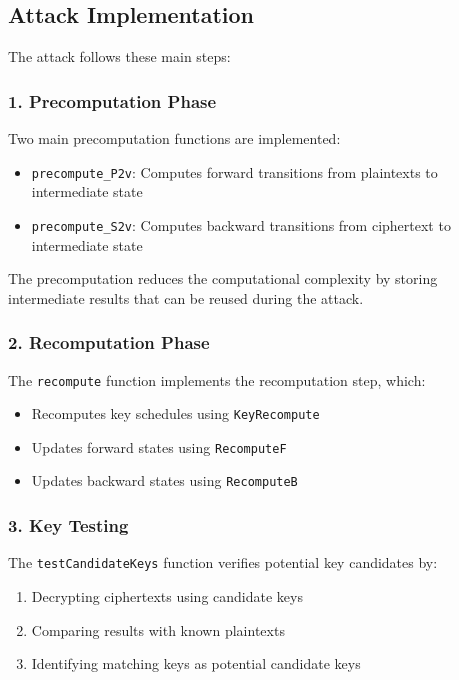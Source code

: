 \documentclass{report}
\begin{document}
\subsection{Attack Implementation}
The attack follows these main steps:

\subsubsection{1. Precomputation Phase}
Two main precomputation functions are implemented:
\begin{itemize}
    \item \texttt{precompute\_P2v}: Computes forward transitions from plaintexts to intermediate state
    \item \texttt{precompute\_S2v}: Computes backward transitions from ciphertext to intermediate state
\end{itemize}

The precomputation reduces the computational complexity by storing intermediate results that can be reused during the attack.

\subsubsection{2. Recomputation Phase}
The \texttt{recompute} function implements the recomputation step, which:
\begin{itemize}
    \item Recomputes key schedules using \texttt{KeyRecompute}
    \item Updates forward states using \texttt{RecomputeF}
    \item Updates backward states using \texttt{RecomputeB}
\end{itemize}

\subsubsection{3. Key Testing}
The \texttt{testCandidateKeys} function verifies potential key candidates by:
\begin{enumerate}
    \item Decrypting ciphertexts using candidate keys
    \item Comparing results with known plaintexts
    \item Identifying matching keys as potential candidate keys
\end{enumerate}
\begin{center}
    
\end{center}
\end{document}
